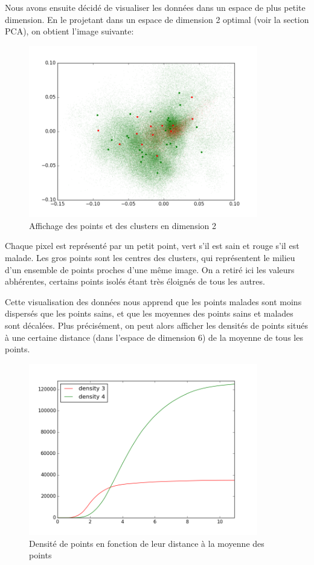 \documentclass[a4paper,10pt]{report}
\begin{document}
Nous avons ensuite décidé de visualiser les données dans un espace de plus petite dimension. En le projetant dans un espace de dimension 2 optimal (voir la section PCA), on obtient l'image suivante:
\begin{figure}[htbp]
  \caption{Affichage des points et des clusters en dimension 2}
  \centering
  \includegraphics[width=10cm]{visualisation.png}
\end{figure}

Chaque pixel est représenté par un petit point, vert s'il est sain et rouge s'il est malade. Les gros points sont les centres des clusters, qui représentent le milieu d'un ensemble de points proches d'une même image. On a retiré ici les valeurs abhérentes, certains points isolés étant très éloignés de tous les autres.


Cette visualisation des données nous apprend que les points malades sont moins dispersés que les points sains, et que les moyennes des points sains et malades sont décalées.
Plus précisément, on peut alors afficher les densités de points situés à une certaine distance (dans l'espace de dimension 6) de la moyenne de tous les points.

\begin{figure}[htbp]
  \caption{Densité de points en fonction de leur distance à la moyenne des points}
  \centering
  \includegraphics[width=10cm]{density.png}
\end{figure}
\end{document}
